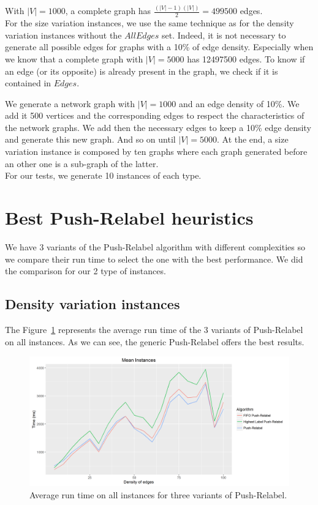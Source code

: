 With $|V|=1000$, a complete graph has $\frac{(|V|-1)(|V|)}{2} = 499500$ edges.\\

For the size variation instances, we use the same technique as for the density variation instances without the $AllEdges$ set. Indeed, it is not necessary to generate all possible edges for graphs with a 10\% of edge density. Especially when we know that a complete graph with $|V|=5000$ has 12497500 edges. To know if an edge (or its opposite) is already present in the graph, we check if it is contained in $Edges$.

We generate a network graph with $|V|=1000$ and an edge density of 10\%. We add it 500 vertices and the corresponding edges to respect the characteristics of the network graphs. We add then the necessary edges to keep a 10\% edge density and generate this new graph. And so on until $|V|=5000$. At the end, a size variation instance is composed by ten graphs where each graph generated before an other one is a sub-graph of the latter. \\

For our tests, we generate 10 instances of each type.

\section{Best Push-Relabel heuristics}
We have 3 variants of the Push-Relabel algorithm with different complexities so we compare their run time to select the one with the best performance. We did the comparison for our 2 type of instances.

\subsection{Density variation instances}
The Figure~\ref{fig:PRs} represents the average run time of the 3 variants of Push-Relabel on all instances. As we can see, the generic Push-Relabel offers the best results.


\begin{figure}[H]
\includegraphics[scale=0.65]{images/meanPRs.png}
\caption{Average run time on all instances for three variants of Push-Relabel.}
\label{fig:PRs}
\end{figure}

